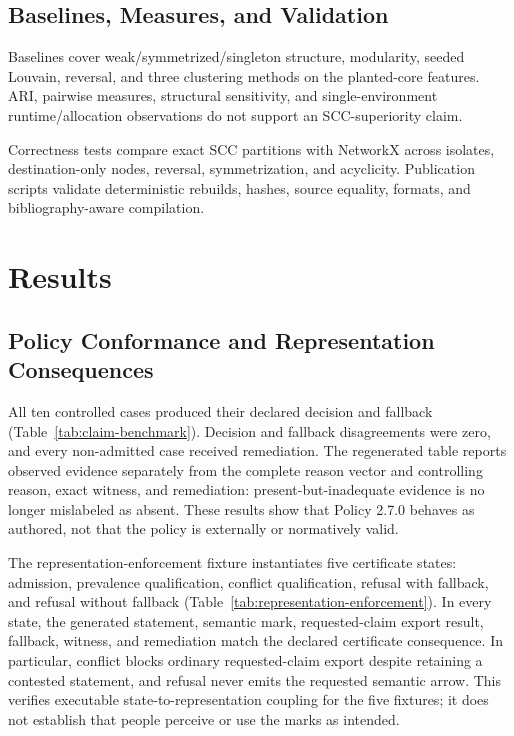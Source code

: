 \documentclass[manuscript,screen,review,anonymous]{acmart}
\begin{document}
\subsection{Baselines, Measures, and Validation}

Baselines cover weak/symmetrized/singleton structure, modularity, seeded Louvain, reversal, and three clustering methods on the planted-core features. ARI, pairwise measures, structural sensitivity, and single-environment runtime/allocation observations do not support an SCC-superiority claim.

Correctness tests compare exact SCC partitions with NetworkX across isolates, destination-only nodes, reversal, symmetrization, and acyclicity. Publication scripts validate deterministic rebuilds, hashes, source equality, formats, and bibliography-aware compilation.

\section{Results}

\subsection{Policy Conformance and Representation Consequences}

All ten controlled cases produced their declared decision and fallback (Table~\ref{tab:claim-benchmark}). Decision and fallback disagreements were zero, and every non-admitted case received remediation. The regenerated table reports observed evidence separately from the complete reason vector and controlling reason, exact witness, and remediation: present-but-inadequate evidence is no longer mislabeled as absent. These results show that Policy 2.7.0 behaves as authored, not that the policy is externally or normatively valid.



The representation-enforcement fixture instantiates five certificate states: admission, prevalence qualification, conflict qualification, refusal with fallback, and refusal without fallback (Table~\ref{tab:representation-enforcement}). In every state, the generated statement, semantic mark, requested-claim export result, fallback, witness, and remediation match the declared certificate consequence. In particular, conflict blocks ordinary requested-claim export despite retaining a contested statement, and refusal never emits the requested semantic arrow. This verifies executable state-to-representation coupling for the five fixtures; it does not establish that people perceive or use the marks as intended.
\end{document}
